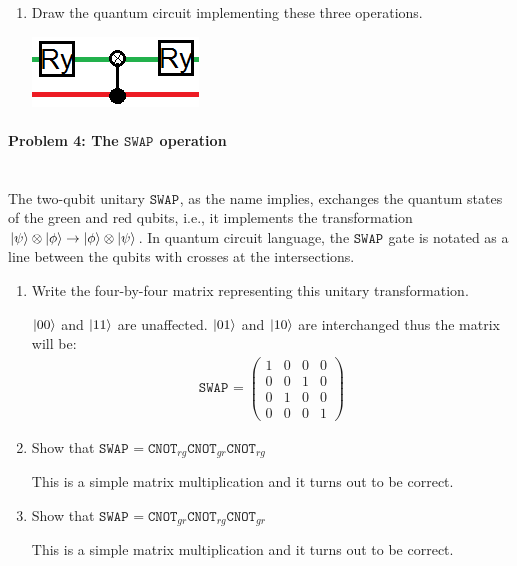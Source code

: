 \documentclass[12pt]{article}
\newcommand{\pmat}[1]{\begin{pmatrix}#1\end{pmatrix}}
\newenvironment{answer}{\begingroup\setlength{\leftskip}{-\leftmargin}\begin{framed}}{\end{framed}\endgroup}
\newcommand{\CNOT}[1]{\ensuremath{\texttt{CNOT}_{#1}}}
\newcommand{\SWAP}[1]{\ensuremath{\texttt{SWAP}_{#1}}}
\begin{document}
\begin{enumerate}
    \item Draw the quantum circuit implementing these three operations.

    \begin{answer}
        \centering\includegraphics{bestpaintjob2013.png}
    \end{answer}
\end{enumerate}

\paragraph{Problem 4: The \SWAP{} operation} \hfill \\

The two-qubit unitary \SWAP{}, as the name implies, exchanges the quantum states of the green and red qubits, i.e., it implements the transformation $\ket{\psi} \otimes \ket{\phi} \rightarrow \ket{\phi} \otimes \ket{\psi}$. In quantum circuit language, the \SWAP{} gate is notated as a line between the qubits with crosses at the intersections.

\begin{enumerate}
    \item Write the four-by-four matrix representing this unitary transformation.

    \begin{answer}
        $\ket{00}$ and $\ket{11}$ are unaffected. $\ket{01}$ and $\ket{10}$ are interchanged thus the matrix will be:
        \begin{align*}
            \SWAP{} = \pmat{1 & 0 & 0 & 0 \\ 0 & 0 & 1 & 0 \\ 0 & 1 & 0 & 0 \\ 0 & 0 & 0 & 1}
        \end{align*}
    \end{answer}

    \item Show that $\SWAP{} = \CNOT{rg}\CNOT{gr}\CNOT{rg}$

    \begin{answer}
        This is a simple matrix multiplication and it turns out to be correct.
    \end{answer}

    \item Show that $\SWAP{} = \CNOT{gr}\CNOT{rg}\CNOT{gr}$

    \begin{answer}
        This is a simple matrix multiplication and it turns out to be correct.
    \end{answer}
\end{enumerate}
\end{document}
